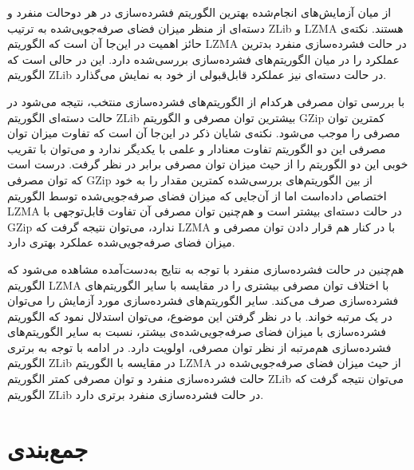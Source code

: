 از میان آزمایش‌های انجام‌شده بهترین الگوریتم فشرده‌سازی در هر دوحالت منفرد و دسته‌ای از منظر میزان فضای صرفه‌جویی‌شده به ترتیب ZLib و LZMA هستند. نکته‌ی حائز اهمیت در این‌جا آن است که الگوریتم LZMA در حالت فشرده‌سازی منفرد بدترین عملکرد را در میان الگوریتم‌های فشرده‌سازی بررسی‌شده دارد. این در حالی است که الگوریتم ZLib در حالت دسته‌ای نیز عملکرد قابل‌قبولی از خود به نمایش می‌گذارد. 

با بررسی توان مصرفی هرکدام از الگوریتم‌های فشرده‌سازی منتخب،‌ نتیجه می‌شود در حالت دسته‌ای الگوریتم ZLib بیشترین توان مصرفی و الگوریتم GZip کمترین توان مصرفی را موجب می‌شود. نکته‌ی شایان ذکر در این‌جا آن است که تفاوت میزان توان مصرفی این دو الگوریتم تفاوت معنادار و علمی با یکدیگر ندارد و می‌توان با تقریب خوبی این دو الگوریتم را از حیث میزان توان مصرفی برابر در نظر گرفت. درست است که توان مصرفی GZip از بین الگوریتم‌های بررسی‌شده کمترین مقدار را به خود اختصاص داده‌است اما از آن‌جایی که میزان فضای صرفه‌جویی‌شده توسط الگوریتم LZMA در حالت دسته‌ای بیشتر است و هم‌چنین توان مصرفی آن تفاوت قابل‌توجهی با GZip ندارد، می‌توان نتیجه گرفت که LZMA با در کنار هم قرار دادن توان مصرفی و میزان فضای صرفه‌جویی‌شده عملکرد بهتری دارد.

هم‌چنین در حالت فشرده‌سازی منفرد با توجه به نتایج به‌دست‌آمده مشاهده می‌شود که الگوریتم LZMA با اختلاف توان مصرفی بیشتری را در مقایسه با سایر الگوریتم‌های فشرده‌سازی صرف می‌کند. سایر الگوریتم‌های فشرده‌سازی  مورد آزمایش را می‌توان در یک مرتبه خواند. با در نظر گرفتن این موضوع، می‌توان استدلال نمود که الگوریتم فشرده‌سازی با میزان فضای صرفه‌جویی‌شده‌ی بیشتر، نسبت به سایر الگوریتم‌های فشرده‌سازی هم‌مرتبه از نظر توان مصرفی، اولویت دارد. در ادامه با توجه به برتری الگوریتم ZLib در مقایسه با الگوریتم LZMA از حیث میزان فضای صرفه‌جویی‌شده در حالت فشرده‌سازی منفرد و توان مصرفی کمتر الگوریتم ZLib می‌توان نتیجه گرفت که الگوریتم ZLib در حالت فشرده‌سازی منفرد برتری دارد.

\section{جمع‌بندی}

